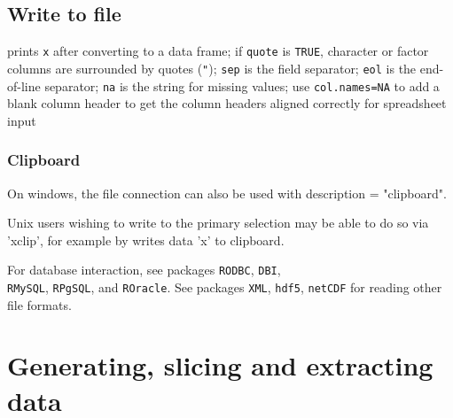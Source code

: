 
\subsection{Write to file}{}
{prints {\tt x} after converting to a data frame; if {\tt quote} is {\tt TRUE},
character or factor columns are surrounded by quotes ({\tt "}); {\tt sep} is
the field separator; {\tt eol} is the end-of-line separator; {\tt na} is the
string for missing values; use {\tt col.names=NA} to add a blank column header
to get the column headers aligned correctly for spreadsheet input}

\subsubsection{Clipboard}

On windows, the file connection can also be used with description =
"clipboard".


Unix users wishing to write to the primary selection may be able to do so via
'xclip', for example by
	{writes data 'x' to clipboard}.

For database interaction, see packages {\tt RODBC}, {\tt DBI},\\
{\tt RMySQL}, {\tt RPgSQL}, and {\tt ROracle}. See packages {\tt XML},
{\tt hdf5}, {\tt netCDF} for reading other file formats.

\section{Generating, slicing and extracting data}{}
